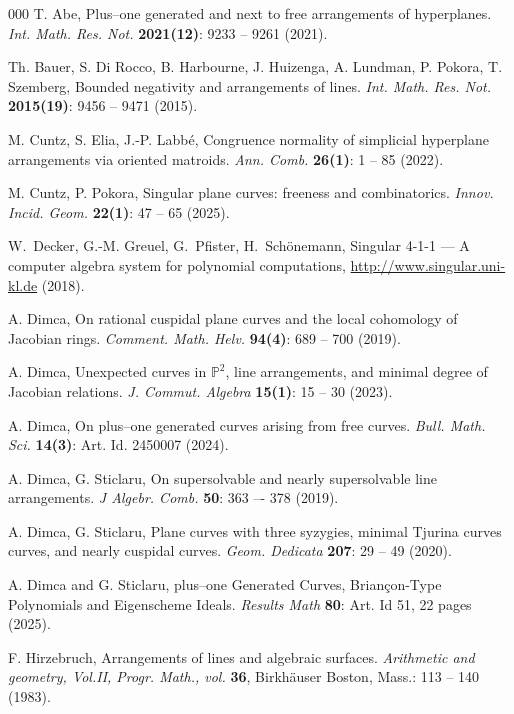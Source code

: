 \documentclass[12pt]{article}
\theoremstyle{plain}
\theoremstyle{definition}
\begin{document}
\begin{thebibliography}{000}
  T. Abe, Plus--one generated and next to free arrangements of hyperplanes. \textit{Int. Math. Res. Not.} \textbf{2021(12)}: 9233 -- 9261 (2021).

Th. Bauer, S. Di Rocco, B. Harbourne, J.  Huizenga, A. Lundman, P. Pokora, T. Szemberg, Bounded negativity and arrangements of lines. \textit{Int. Math. Res. Not.} \textbf{2015(19)}: 9456 -- 9471 (2015).

M. Cuntz, S. Elia, J.-P. Labb\'e, Congruence normality of simplicial hyperplane arrangements via oriented matroids. \textit{Ann. Comb.} \textbf{26(1)}: 1 -- 85 (2022).

M. Cuntz, P. Pokora, Singular plane curves: freeness and combinatorics. \textit{Innov. Incid. Geom.} \textbf{22(1)}: 47 -- 65 (2025).

 W.~Decker, G.-M. Greuel, G.~Pfister, H.~Sch\"onemann, Singular {4-1-1} --- {A} computer algebra system for polynomial computations, \url{http://www.singular.uni-kl.de} (2018).

A. Dimca, On rational cuspidal plane curves and the local cohomology of Jacobian rings. \textit{Comment. Math. Helv.} \textbf{94(4)}: 689 -- 700 (2019).

A. Dimca, Unexpected curves in $\mathbb{P}^{2}$, line arrangements, and minimal degree of Jacobian relations. \textit{J. Commut. Algebra} \textbf{15(1)}: 15 -- 30 (2023).

A. Dimca, On plus--one generated curves arising from free curves. \textit{Bull. Math. Sci.} \textbf{14(3)}: Art. Id. 2450007 (2024).

A. Dimca, G. Sticlaru, On supersolvable and nearly supersolvable line arrangements. \textit{J Algebr. Comb.} \textbf{50}: 363 –- 378 (2019).

A. Dimca, G. Sticlaru, Plane curves with three syzygies, minimal Tjurina curves curves, and nearly cuspidal curves. \textit{Geom. Dedicata}  {\bf 207}:  29 -- 49 (2020).

A. Dimca and G. Sticlaru, plus--one Generated Curves, Briançon-Type Polynomials and Eigenscheme Ideals. \textit{Results Math}  \textbf{80}: Art. Id 51, 22 pages (2025).

F. Hirzebruch, Arrangements of lines and algebraic surfaces. \textit{Arithmetic and geometry, Vol.II, Progr. Math., vol.} \textbf{36}, Birkh\"auser Boston, Mass.: 113 -- 140 (1983).


\end{thebibliography}
\end{document}
